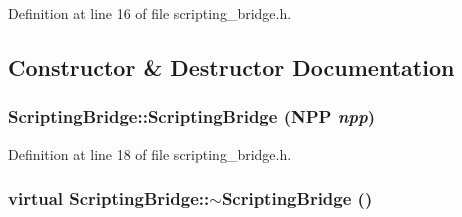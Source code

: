 Definition at line 16 of file scripting\_\-bridge.h.



\subsection{Constructor \& Destructor Documentation}
\hypertarget{class_scripting_bridge_ae743ff1b8ffce6889a86a73500fd0da1}{
\subsubsection[{ScriptingBridge}]{\setlength{\rightskip}{0pt plus 5cm}ScriptingBridge::ScriptingBridge (NPP {\em npp})}}
\label{class_scripting_bridge_ae743ff1b8ffce6889a86a73500fd0da1}


Definition at line 18 of file scripting\_\-bridge.h.

\hypertarget{class_scripting_bridge_a8e85d3e7803f38a7182ac2be45d45a4d}{
\subsubsection[{$\sim$ScriptingBridge}]{\setlength{\rightskip}{0pt plus 5cm}virtual ScriptingBridge::$\sim$ScriptingBridge ()}}
\label{class_scripting_bridge_a8e85d3e7803f38a7182ac2be45d45a4d}


